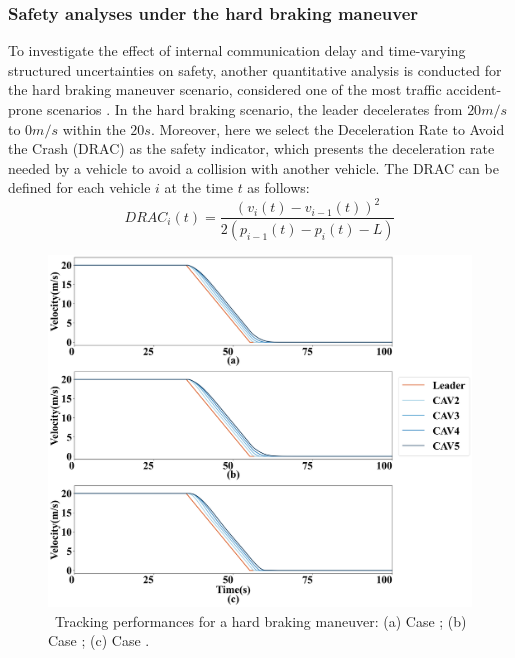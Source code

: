 \documentclass[a4paper]{cas-sc}
\begin{document}
\subsubsection{Safety analyses under the hard braking maneuver}
\label{Section 5.2.2}

To investigate the effect of internal communication delay and time-varying structured uncertainties on safety, another quantitative analysis is conducted for the hard braking maneuver scenario, considered one of the most traffic accident-prone scenarios \citep{Taheri1990,Saito2016,zhang2015all}. In the hard braking scenario, the leader decelerates from $20m/s$ to $0m/s$ within the $20s$. Moreover, here we select the Deceleration Rate to Avoid the Crash (DRAC) as the safety indicator, which presents the deceleration rate needed by a vehicle to avoid a collision with another vehicle. The DRAC can be defined for each vehicle $i$ at the time $t$ as follows:
\begin{equation*}
  DRAC{_i}(t) = \frac{{{{\left( {{v_i}(t) - {v_{i - 1}}(t)} \right)}^2}}}{{2\left( {{p_{i - 1}}(t) - {p_i}(t) - L} \right)}}
\end{equation*}

\begin{figure}
  \centering
  \includegraphics[width=14cm]{figs/fig7.png}
  \caption{~Tracking performances for a hard braking maneuver: (a) Case \uppercase\expandafter{}; (b) Case \uppercase\expandafter{}; (c) Case \uppercase\expandafter{}.}
  \label{fig7}
\end{figure}
\end{document}
